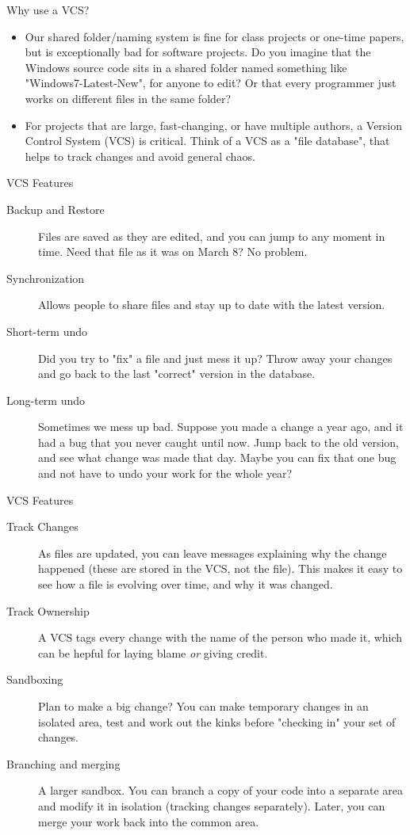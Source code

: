 \begin{frame}{Why use a VCS?}
\begin{itemize}
\item Our shared folder/naming system is fine for class projects or one-time
papers, but is exceptionally bad for software projects. Do you imagine
that the Windows source code sits in a shared folder named something
like "Windows7-Latest-New", for anyone to edit? Or that every programmer
just works on different files in the same folder?

\item For projects that are large, fast-changing, or have multiple authors, a
Version Control System (VCS) is critical. Think of a VCS as a "file
database", that helps to track changes and avoid general chaos.
\end{itemize}
\end{frame}

\begin{frame}{VCS Features}
\begin{description}
\item[Backup and Restore] Files are saved as they are edited, and
  you can jump to any moment in time. Need that file as it was on March
  8? No problem.
\item[Synchronization] Allows people to share files and stay up
  to date with the latest version.
\item[Short-term undo] Did you try to "fix" a file and just mess
  it up? Throw away your changes and go back to the last "correct"
  version in the database.
\item[Long-term undo] Sometimes we mess up bad. Suppose you made
  a change a year ago, and it had a bug that you never caught until now.
  Jump back to the old version, and see what change was made that day.
  Maybe you can fix that one bug and not have to undo your work for the
  whole year?
\end{description}
\end{frame}

\begin{frame}{VCS Features}
\begin{description}
\item[Track Changes] As files are updated, you can leave messages
  explaining why the change happened (these are stored in the VCS, not
  the file). This makes it easy to see how a file is evolving over time,
  and why it was changed.
\item[Track Ownership] A VCS tags every change with the name of
  the person who made it, which can be hepful for laying blame \emph{or}
  giving credit.
\item[Sandboxing] Plan to make
  a big change? You can make temporary changes in an isolated area, test
  and work out the kinks before "checking in" your set of changes.
\item[Branching and merging] A larger sandbox. You can branch a
  copy of your code into a separate area and modify it in isolation
  (tracking changes separately). Later, you can merge your work back
  into the common area.
\end{description}
\end{frame}

